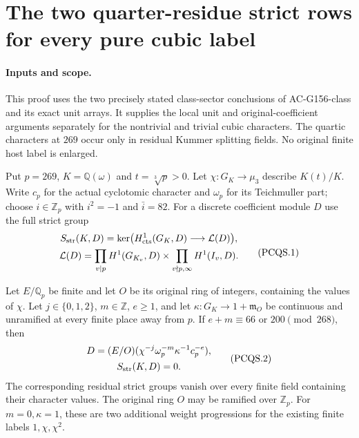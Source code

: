 \section{The two quarter-residue strict rows for every pure cubic label}
\label{sec:pure-cubic-quartic-residue-strict}

\paragraph{Inputs and scope.}
This proof uses the two precisely stated class-sector conclusions
of AC-G156-class and its exact unit arrays.
It supplies the local unit and original-coefficient arguments
separately for the nontrivial and trivial cubic characters.
The quartic characters at $269$ occur only in residual Kummer
splitting fields.  No original finite host label is enlarged.

Put $p=269$, $K=\mathbb Q(\omega)$ and $t=\sqrt[3]p>0$.
Let $\chi:G_K\to\mu_3$ describe $K(t)/K$.
Write $c_p$ for the actual cyclotomic character and $\omega_p$
for its Teichmuller part; choose $i\in\mathbb Z_p$ with
$i^2=-1$ and $\bar i=82$.
For a discrete coefficient module $D$ use the full strict group
\[
 \begin{gathered}
 S_{\rm str}(K,D)=\ker\bigl(H^1_{\rm cts}(G_K,D)
                                   \longrightarrow\mathcal L(D)\bigr),\\
 \mathcal L(D)=\prod_{v\mid p}H^1(G_{K_v},D)
              \times\prod_{v\nmid p,\infty}H^1(I_v,D).
 \end{gathered}
 \tag{PCQS.1}
\]

\begin{theorem}
\label{AC-G156}
Let $E/\mathbb Q_p$ be finite and let $O$ be its original ring
of integers, containing the values of $\chi$.
Let $j\in\{0,1,2\}$, $m\in\mathbb Z$, $e\geq1$, and let
$\kappa:G_K\to1+\mathfrak m_O$ be continuous and unramified
at every finite place away from $p$.
If $e+m\equiv66$ or $200\pmod{268}$, then
\[
 \begin{gathered}
 D=(E/O)(\chi^{-j}\omega_p^{-m}\kappa^{-1}c_p^{-e}),\\
                          S_{\rm str}(K,D)=0.
 \end{gathered}
 \tag{PCQS.2}
\]
The corresponding residual strict groups vanish over every finite
field containing their character values.
The original ring $O$ may be ramified over $\mathbb Z_p$.
For $m=0,\kappa=1$, these are two additional weight progressions
for the existing finite labels $1,\chi,\chi^2$.
\end{theorem}

